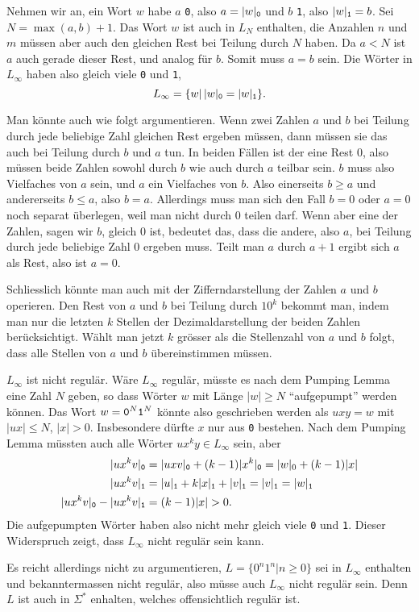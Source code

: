 \begin{loesung}
\begin{teilaufgaben}
\item Nehmen wir an, ein Wort $w$ habe $a$ {\tt 0}, also $a=|w|_{\tt 0}$ und
$b$ {\tt 1}, also $|w|_{\tt 1}=b$.
Sei $N=\max(a,b) + 1$. Das Wort $w$ ist auch in $L_N$ enthalten,
die Anzahlen $n$ und $m$ müssen aber auch den gleichen Rest bei
Teilung durch $N$ haben. Da $a<N$ ist $a$ auch gerade dieser Rest,
und analog für $b$. Somit muss $a=b$ sein. Die Wörter in
$L_\infty$ haben also gleich viele {\tt 0} und {\tt 1},
\[
L_\infty=\{w|\,|w|_{\tt 0}=|w|_{\tt 1}\}.
\]

Man könnte auch wie folgt argumentieren. Wenn zwei Zahlen $a$ und $b$
bei Teilung durch jede beliebige Zahl gleichen Rest ergeben müssen,
dann müssen sie das auch bei Teilung durch $b$ und $a$ tun. In beiden
Fällen ist der eine Rest $0$, also müssen beide Zahlen sowohl durch
$b$ wie auch durch $a$ teilbar sein. $b$ muss also Vielfaches von $a$
sein, und $a$ ein Vielfaches von $b$. Also einerseits $b\ge a$ und andererseits
$b\le a$, also $b=a$. Allerdings muss man sich den Fall $b=0$ oder $a=0$
noch separat überlegen, weil man nicht durch $0$ teilen darf. Wenn
aber eine der Zahlen, sagen wir $b$, gleich $0$ ist, bedeutet das, dass
die andere, also $a$, bei Teilung durch jede beliebige Zahl $0$ ergeben
muss. Teilt man $a$ durch $a+1$ ergibt sich $a$ als Rest, also ist $a=0$.

Schliesslich könnte man auch mit der Zifferndarstellung der Zahlen
$a$ und $b$ operieren. Den Rest von $a$ und $b$ bei Teilung durch
$10^k$ bekommt man, indem man nur die letzten $k$ Stellen der
Dezimaldarstellung der beiden Zahlen berücksichtigt. Wählt man
jetzt $k$ grösser als die Stellenzahl von $a$ und $b$ folgt,
dass alle Stellen von $a$ und $b$ übereinstimmen müssen.

\item $L_\infty$ ist nicht regulär. Wäre $L_\infty$ regulär,
müsste es nach dem Pumping Lemma eine Zahl $N$ geben, so dass
Wörter $w$ mit Länge $|w|\ge N$ ``aufgepumpt'' werden können.
Das Wort $w={\tt 0}^N{\tt 1}^N$ könnte also geschrieben werden
als $uxy=w$ mit $|ux|\le N$, $|x|>0$. Insbesondere dürfte $x$ nur
aus {\tt 0} bestehen. Nach dem Pumping Lemma müssten auch alle
Wörter $ux^ky\in L_\infty$ sein, aber
\begin{align*}
|ux^kv|_{\tt 0}
&=
|uxv|_{\tt 0}
+
(k-1) |x^k|_{\tt 0}
=
|w|_0+(k-1)|x|
\\
|ux^kv|_{\tt 1}
&=
|u|_{\tt 1} + k|x|_{\tt 1} + |v|_{\tt 1}
=
|v|_{\tt 1}
=|w|_{\tt 1}
\\
|ux^kv|_{\tt 0}
-
|ux^kv|_{\tt 1}
&=
(k-1)|x|>0.
\end{align*}
Die aufgepumpten Wörter haben also nicht mehr gleich viele
{\tt 0} und {\tt 1}. Dieser Widerspruch zeigt, dass $L_\infty$
nicht regulär sein kann.

Es reicht allerdings nicht zu argumentieren, $L=\{ 0^n1^n|n \ge 0\}$
sei in $L_\infty$ enthalten und bekanntermassen nicht regulär,
also müsse auch $L_\infty$ nicht regulär sein. Denn $L$ ist auch
in $\Sigma^*$ enhalten, welches offensichtlich regulär ist.
\qedhere
\end{teilaufgaben}
\end{loesung}


